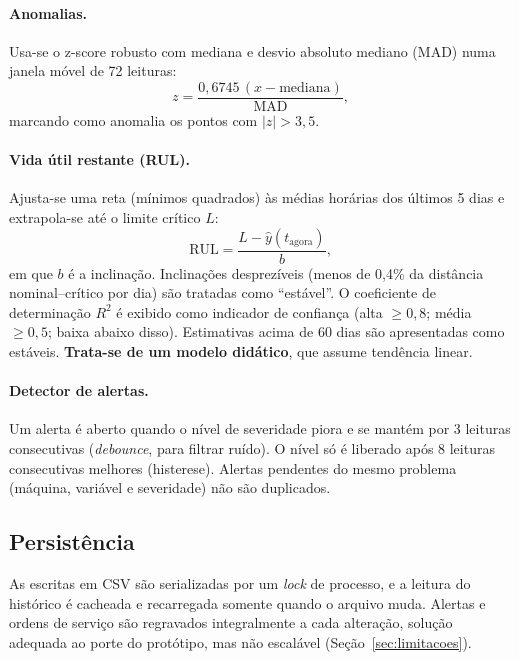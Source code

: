 \documentclass[12pt,a4paper]{article}
\begin{document}
\paragraph{Anomalias.} Usa-se o z-score robusto com mediana e desvio absoluto mediano (MAD) numa janela móvel de 72 leituras:
\begin{equation}
z = \frac{0{,}6745\,(x - \mathrm{mediana})}{\mathrm{MAD}},
\end{equation}
marcando como anomalia os pontos com $|z| > 3{,}5$.

\paragraph{Vida útil restante (RUL).} Ajusta-se uma reta (mínimos quadrados) às médias horárias dos últimos 5 dias e extrapola-se até o limite crítico $L$:
\begin{equation}
\mathrm{RUL} = \frac{L - \hat{y}(t_{\text{agora}})}{b},
\end{equation}
em que $b$ é a inclinação. Inclinações desprezíveis (menos de 0{,}4\% da distância nominal--crítico por dia) são tratadas como ``estável''. O coeficiente de
determinação $R^2$ é exibido como indicador de confiança (alta $\ge 0{,}8$; média $\ge 0{,}5$; baixa abaixo disso). Estimativas acima de 60 dias são
apresentadas como estáveis. \textbf{Trata-se de um modelo didático}, que assume tendência linear.

\paragraph{Detector de alertas.} Um alerta é aberto quando o nível de severidade piora e se mantém por 3 leituras consecutivas (\emph{debounce}, para filtrar
ruído). O nível só é liberado após 8 leituras consecutivas melhores (histerese). Alertas pendentes do mesmo problema (máquina, variável e severidade)
não são duplicados.

\subsection{Persistência}
As escritas em CSV são serializadas por um \emph{lock} de processo, e a leitura do histórico é cacheada e recarregada somente quando o arquivo muda.
Alertas e ordens de serviço são regravados integralmente a cada alteração, solução adequada ao porte do protótipo, mas não escalável (Seção~\ref{sec:limitacoes}).

\end{document}
